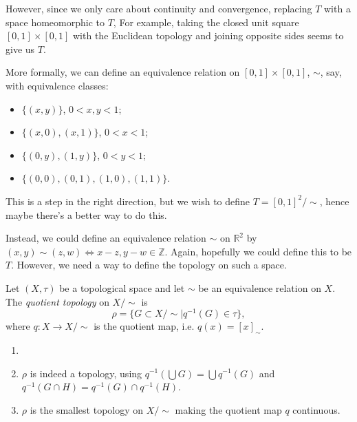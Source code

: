 \documentclass[12pt]{article}
\begin{document}
However, since we only care about continuity and convergence, replacing $T$ with a space homeomorphic to $T$, For example, taking the closed unit square $[0, 1] \times [0, 1]$ with the Euclidean topology and joining opposite sides seems to give us $T$.

More formally, we can define an equivalence relation on $[0, 1] \times [0, 1]$, $\sim$, say, with equivalence classes:
\begin{itemize}
	\item $\{(x, y)\}$, $0 < x, y < 1$;
	\item $\{(x, 0), (x, 1)\}$, $0 < x < 1$;
	\item $\{(0, y), (1, y)\}$, $0 < y < 1$;
	\item $\{(0, 0), (0, 1), (1, 0), (1, 1)\}$.
\end{itemize}
This is a step in the right direction, but we wish to define $T = [0,1]^2/\sim$, hence maybe there's a better way to do this.

Instead, we could define an equivalence relation $\sim$ on $\mathbb{R}^2$ by $(x, y) \sim (z, w) \iff x - z, y - w \in \mathbb{Z}$. Again, hopefully we could define this to be $T$. However, we need a way to define the topology on such a space.

\begin{definition}
	Let $(X, \tau)$ be a topological space and let $\sim$ be an equivalence relation on $X$. The \textit{quotient topology} on $X/\sim$ is
	\[
		\rho = \{G \subset X/\sim \mid q^{-1}(G) \in \tau\}
	,\]
	where $q : X \to X/\sim$ is the quotient map, i.e. $q(x) = [x]_{\sim}$.
\end{definition}

\begin{remark}
	\begin{enumerate}[1.]
		\item[]
		\item $\rho$ is indeed a topology, using $q^{-1}(\bigcup G) = \bigcup q^{-1}(G)$ and $q^{-1}(G \cap H) = q^{-1}(G) \cap q^{-1}(H)$.
		\item $\rho$ is the smallest topology on $X/\sim$ making the quotient map $q$ continuous.
	\end{enumerate}
\end{remark}
\end{document}

